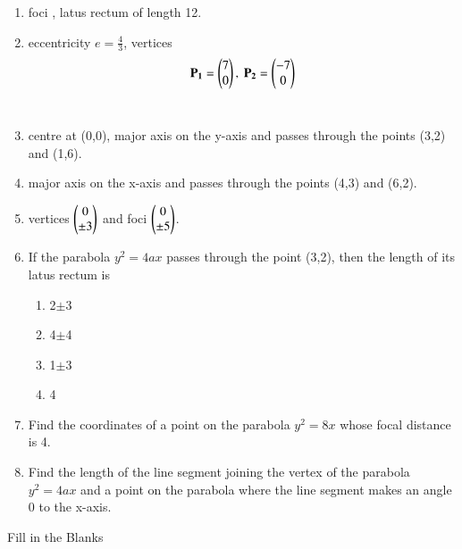 \begin{enumerate}[label=\thesubsection.\arabic*,ref=\thesubsection.\theenumi,resume*]
\item  foci , latus rectum of length 12.
\\
\solution
    \item eccentricity $e = \frac{4}{3}$,
    vertices 
    \begin{align}
        \mathbf{P_1} = \begin{pmatrix}7\\0\end{pmatrix},\ \mathbf{P_2} = \begin{pmatrix}-7\\0\end{pmatrix}
        \label{eq:chapters/11/11/4/14/vert}
    \end{align}
\\
\solution
\item centre at (0,0), major axis on the y-axis and passes through the points (3,2) and (1,6).
\\
\solution
\item major axis on the x-axis and passes through the points (4,3) and (6,2).
\\
\solution
\item vertices $\begin{pmatrix}0\\\pm 3\end{pmatrix}$ and foci $\begin{pmatrix}0\\\pm5\end{pmatrix}$.
	\\
\solution
\item If the parabola $y^2=4ax$ passes through the point (3,2), then the length of its latus rectum is
\begin{enumerate}
\item 2$\pm$3
\item 4$\pm$4
\item 1$\pm$3
\item 4
\end{enumerate}
 \item Find the coordinates of a point on the parabola $y^2=8x$ whose focal distance is 4.
 \item Find the length of the line segment joining the vertex of the parabola $y^2=4ax$ and a point on the parabola where the line segment makes an angle 0 to the x-axis.
\end{enumerate}
Fill in the Blanks
